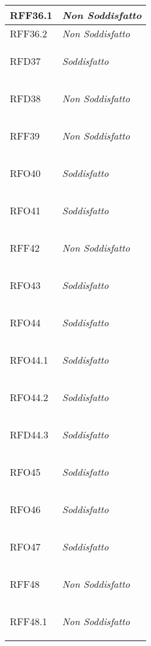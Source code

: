 \begin{longtable}{|>{\centering}m{5cm}|m{5cm}<{\centering}|}
    \hypertarget{RFF36.1}{RFF36.1} & \textit{Non Soddisfatto}\\ \hline
   
    \hypertarget{RFF36.2}{RFF36.2} & \textit{Non Soddisfatto}\\ \hline
   
    \hypertarget{RFD37}{RFD37} & \textit{Soddisfatto}\\ \hline
   
    \hypertarget{RFD38}{RFD38} & \textit{Non Soddisfatto}\\ \hline
   
    \hypertarget{RFF39}{RFF39} & \textit{Non Soddisfatto}\\ \hline
   
    \hypertarget{RFO40}{RFO40} & \textit{Soddisfatto}\\ \hline
   
    \hypertarget{RFO41}{RFO41} & \textit{Soddisfatto}\\ \hline
   
    \hypertarget{RFF42}{RFF42} & \textit{Non Soddisfatto}\\ \hline
   
    \hypertarget{RFO43}{RFO43} & \textit{Soddisfatto}\\ \hline
   
    \hypertarget{RFO44}{RFO44} & \textit{Soddisfatto}\\ \hline
   
    \hypertarget{RFO44.1}{RFO44.1} & \textit{Soddisfatto}\\ \hline
   
    \hypertarget{RFO44.2}{RFO44.2} & \textit{Soddisfatto}\\ \hline
   
    \hypertarget{RFD44.3}{RFD44.3} & \textit{Soddisfatto}\\ \hline
   
    \hypertarget{RFO45}{RFO45} & \textit{Soddisfatto}\\ \hline
   
    \hypertarget{RFO46}{RFO46} & \textit{Soddisfatto}\\ \hline
   
    \hypertarget{RFO47}{RFO47} & \textit{Soddisfatto}\\ \hline
   
    \hypertarget{RFF48}{RFF48} & \textit{Non Soddisfatto}\\ \hline
   
    \hypertarget{RFF48.1}{RFF48.1} & \textit{Non Soddisfatto}\\ \hline
   

\end{longtable}
